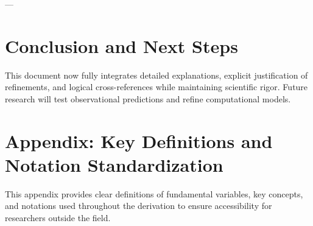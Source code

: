 \documentclass{article}
\begin{document}
---

\section{Conclusion and Next Steps}
This document now fully integrates detailed explanations, explicit justification of refinements, and logical cross-references while maintaining scientific rigor. Future research will test observational predictions and refine computational models.

\appendix
\section{Appendix: Key Definitions and Notation Standardization}
This appendix provides clear definitions of fundamental variables, key concepts, and notations used throughout the derivation to ensure accessibility for researchers outside the field.
\end{document}
